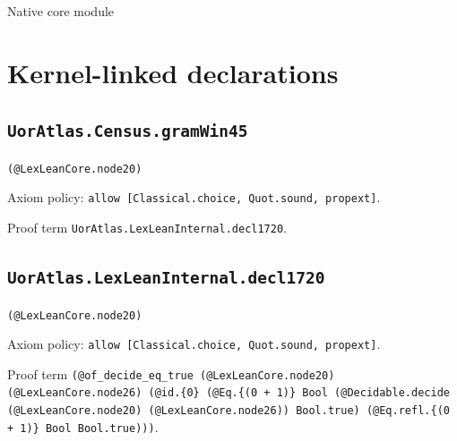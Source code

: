 \documentclass[11pt]{article}
\begin{document}
\begin{center}{\LARGE Native core module}\end{center}
\section*{Kernel-linked declarations}
\subsection*{\texttt{UorAtlas.Census.gramWin45}}
\noindent\texttt{(@LexLeanCore.node20)}\par
\noindent Axiom policy: \texttt{allow [Classical.choice, Quot.sound, propext]}.\par
\noindent Proof term \texttt{UorAtlas.LexLeanInternal.decl1720}.\par
\subsection*{\texttt{UorAtlas.LexLeanInternal.decl1720}}
\noindent\texttt{(@LexLeanCore.node20)}\par
\noindent Axiom policy: \texttt{allow [Classical.choice, Quot.sound, propext]}.\par
\noindent Proof term \texttt{(@of\_decide\_eq\_true (@LexLeanCore.node20) (@LexLeanCore.node26) (@id.\{0\} (@Eq.\{(0 + 1)\} Bool (@Decidable.decide (@LexLeanCore.node20) (@LexLeanCore.node26)) Bool.true) (@Eq.refl.\{(0 + 1)\} Bool Bool.true)))}.\par
\end{document}
